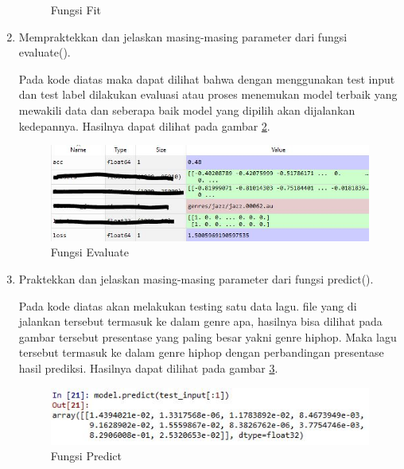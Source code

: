 \begin{enumerate}
\begin{figure}[!htbp]
\caption{Fungsi Fit}
\label{c6t_14}
\end{figure}
\item Mempraktekkan dan jelaskan masing-masing parameter dari fungsi evaluate().

\subitem Pada kode diatas maka dapat dilihat bahwa dengan menggunakan test input dan test label dilakukan evaluasi atau proses menemukan model terbaik yang mewakili data dan seberapa baik model yang dipilih akan dijalankan kedepannya. Hasilnya dapat dilihat pada gambar \ref{c6t_15}.
\begin{figure}[!htbp]
\centerline{\includegraphics[width=1\textwidth]{figures/c6t/15.JPG}}
\caption{Fungsi Evaluate}
\label{c6t_15}
\end{figure}
\item Praktekkan dan jelaskan masing-masing parameter dari fungsi predict(). 

\subitem Pada kode diatas akan melakukan testing satu data lagu. file yang di jalankan tersebut termasuk ke dalam genre apa, hasilnya bisa dilihat pada gambar tersebut presentase yang paling besar yakni genre hiphop. Maka lagu tersebut termasuk ke dalam genre hiphop dengan perbandingan presentase hasil prediksi. Hasilnya dapat dilihat pada gambar \ref{c6t_16}.
\begin{figure}[!htbp]
\centerline{\includegraphics[width=1\textwidth]{figures/c6t/16.JPG}}
\caption{Fungsi Predict}
\label{c6t_16}
\end{figure}
\end{enumerate}

